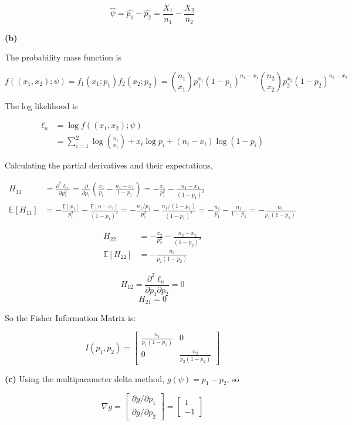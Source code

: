 \[\hat{\psi} = \hat{p_1} - \hat{p_2} = \frac{X_1}{n_1} - \frac{X_2}{n_2}\]

\textbf{(b)}

The probability mass function is

\[f((x_1, x_2); \psi) = f_1(x_1; p_1) f_2(x_2; p_2) = 
\binom{n_1}{x_1} p_1^{x_1} (1 - p_1)^{n_1 - x_1}
\binom{n_2}{x_2} p_2^{x_2} (1 - p_2)^{n_2 - x_2}
\]

The log likelihood is

\begin{align}
\ell_n &= \log f((x_1, x_2); \psi) \\
&= \sum_{i=1}^2 \log \binom{n_i}{x_i} + x_i \log p_i + (n_i - x_i) \log (1 - p_i)
\end{align}\]

Calculating the partial derivatives and their expectations,

\begin{align}
H_{11} & = \frac{\partial^2 \ell_n}{\partial p_1^2}
= \frac{\partial}{\partial p_1} \left( \frac{x_1}{p_1} - \frac{n_1 - x_1}{1 - p_1}\right)
= -\frac{x_1}{p_1^2} - \frac{n_1 - x_1}{(1 - p_1)^2} \\
\mathbb{E}[H_{11}] &= -\frac{\mathbb{E}[x_1]}{p_1^2} - \frac{\mathbb{E}[n - x_1]}{(1 - p_1)^2}
= -\frac{n_1 / p_1}{p_1^2} - \frac{n_1/(1 - p_1)}{(1 - p_1)^2}
= -\frac{n_1}{p_1} - \frac{n_1}{1 - p_1} = -\frac{n_1}{p_1(1 - p_1)}
\end{align}

\begin{align}
H_{22} &= -\frac{x_2}{p_2^2} - \frac{n_2 - x_2}{(1 - p_2)^2} \\
\mathbb{E}[H_{22}] &= -\frac{n_2}{p_2(1 - p_2)}
\end{align}

\[ H_{12} = \frac{\partial^2 \ell_n}{\partial p_1 \partial p_2} = 0\]
\[ H_{21} = 0\]

So the Fisher Information Matrix is:

\[ I(p_1, p_2) = \begin{bmatrix}
\frac{n_1}{p_1(1 - p_1)} & 0\\
0 & \frac{n_2}{p_2(1 - p_2)}
\end{bmatrix}\]

\textbf{(c)} Using the multiparameter delta method,
\(g(\psi) = p_1 - p_2\), so

\[ \nabla g = \begin{bmatrix}
\partial g / \partial p_1 \\ \partial g / \partial p_2
\end{bmatrix}
= \begin{bmatrix}
1 \\ -1
\end{bmatrix}\]

